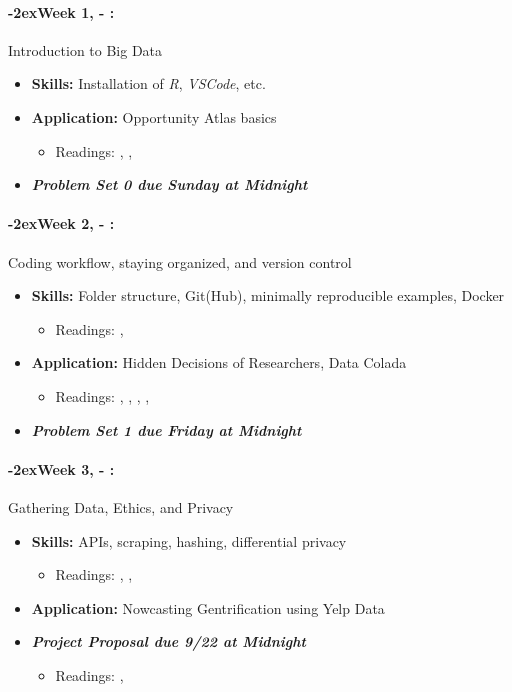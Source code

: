 \documentclass[11pt]{article}
\newcommand{\week}[1]{%
  \paragraph*{\kern-2ex\quad #1, \AdvanceDate[1]\syldate{\today} - \AdvanceDate[2]\syldate{\today}:}%
  \ifdim\wd1=\wd\MONDAY
    \AdvanceDate[7]
  \else
    \AdvanceDate[7]
  \fi%
}
\begin{document}
\normalsize

\SetDate[28/08/2023]
\week{Week 1} Introduction to Big Data
\begin{itemize}
  \item \textbf{Skills:} Installation of \textit{R}, \textit{VSCode}, etc.
  \item \textbf{Application:} Opportunity Atlas basics
  \begin{itemize}
    \item Readings: \textbf{\cite{chetty2018opportunityatlas}}, \cite{chetty2020opportunity}, \cite{einav2014ageofbigdata}
  \end{itemize}
  \item \textit{\textbf{Problem Set 0 due Sunday at Midnight}}
\end{itemize}
\week{Week 2} Coding workflow, staying organized, and version control
\begin{itemize}
  \item \textbf{Skills:} Folder structure, Git(Hub), minimally reproducible examples, Docker
  \begin{itemize}
    \item Readings: \textbf{\cite{gentzkowshapiro2014code}}, \cite{mcdermott2022docker}
  \end{itemize}
  \item \textbf{Application:} Hidden Decisions of Researchers, Data Colada
  \begin{itemize}
    \item Readings: \textbf{\cite{huntingtonklen2021influence}}, \cite{tinyverse}, \cite{wickhamtidy}, \cite{datacolada2021groundhog}, \cite{datacolada2022groundhog}
  \end{itemize}
  \item \textit{\textbf{Problem Set 1 due Friday at Midnight}}
\end{itemize}
\week{Week 3} Gathering Data, Ethics, and Privacy
\begin{itemize}
\item \textbf{Skills:} APIs, scraping, hashing, differential privacy
\begin{itemize}
  \item Readings: \textbf{\cite{chetty2019privacy}}, \cite{abowd2019privacy}, \cite{apiintro}
\end{itemize}
\item \textbf{Application:} Nowcasting Gentrification using Yelp Data
\item \textit{\textbf{Project Proposal due 9/22 at Midnight}}
\begin{itemize}
  \item Readings: \textbf{\cite{glaeser2018gentrification}}, \cite{glaeser2017local}
\end{itemize}
\end{itemize} 
\end{document}
